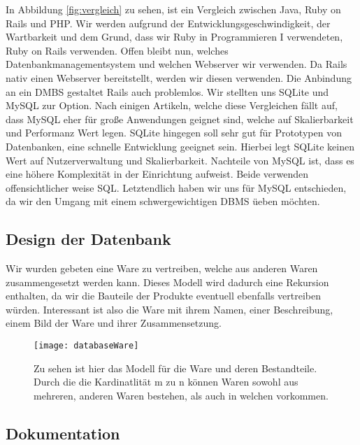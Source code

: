 \documentclass[pdftex,10pt,a4paper]{article}
\begin{document}
In Abbildung \ref{fig:vergleich} zu sehen, ist ein Vergleich zwischen Java, Ruby on Rails und PHP. Wir werden aufgrund der Entwicklungsgeschwindigkeit, der Wartbarkeit und dem Grund, dass wir Ruby in Programmieren I verwendeten, Ruby on Rails verwenden. Offen bleibt nun, welches Datenbankmanagementsystem und welchen Webserver wir verwenden. Da Rails nativ einen Webserver bereitstellt, werden wir diesen verwenden. Die Anbindung an ein DMBS gestaltet Rails auch problemlos. Wir stellten uns SQLite und MySQL zur Option. Nach einigen Artikeln, welche diese Vergleichen f\"allt auf, dass MySQL eher f\"ur gro{\ss}e Anwendungen geignet sind, welche auf Skalierbarkeit und Performanz Wert legen. SQLite hingegen soll sehr gut f\"ur Prototypen von Datenbanken, eine schnelle Entwicklung geeignet sein. Hierbei legt SQLite keinen Wert auf Nutzerverwaltung und Skalierbarkeit. Nachteile von MySQL ist, dass es eine h\"ohere Komplexit\"at in der Einrichtung aufweist. Beide verwenden offensichtlicher weise SQL. Letztendlich haben wir uns f\"ur MySQL entschieden, da wir den Umgang mit einem schwergewichtigen DBMS \"ueben m\"ochten.

\subsection{Design der Datenbank}
\label{sec:dbdesign}
Wir wurden gebeten eine Ware zu vertreiben, welche aus anderen Waren zusammengesetzt werden kann. Dieses Modell wird dadurch eine Rekursion enthalten, da wir die Bauteile der Produkte eventuell ebenfalls vertreiben w\"urden. Interessant ist also die Ware mit ihrem Namen, einer Beschreibung, einem Bild der Ware und ihrer Zusammensetzung.

\begin{wrapfigure}{R}{0.5\textwidth}
  	\begin{center}
    	\texttt{[image: databaseWare]}
 	 \end{center}
  	\caption{Zu sehen ist hier das Modell f\"ur die Ware und deren Bestandteile. Durch die die Kardinatlit\"at m zu n k\"onnen Waren sowohl aus mehreren, anderen Waren bestehen, als auch in welchen vorkommen.}
\end{wrapfigure}

\subsection{Dokumentation}
\end{document}

